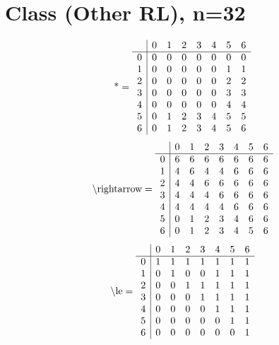 \documentclass[11pt]{article}
\begin{document}
\section{Class (Other RL), n=32}
\[\text{*} = 
\begin{array}{r | r r r r r r r}
 & 0 & 1 & 2 & 3 & 4 & 5 & 6 \\ \hline
0 & 0 & 0 & 0 & 0 & 0 & 0 & 0 \\
1 & 0 & 0 & 0 & 0 & 0 & 1 & 1 \\
2 & 0 & 0 & 0 & 0 & 0 & 2 & 2 \\
3 & 0 & 0 & 0 & 0 & 0 & 3 & 3 \\
4 & 0 & 0 & 0 & 0 & 0 & 4 & 4 \\
5 & 0 & 1 & 2 & 3 & 4 & 5 & 5 \\
6 & 0 & 1 & 2 & 3 & 4 & 5 & 6 \\
\end{array}
\]
\[\text{\textbackslash rightarrow} = 
\begin{array}{r | r r r r r r r}
 & 0 & 1 & 2 & 3 & 4 & 5 & 6 \\ \hline
0 & 6 & 6 & 6 & 6 & 6 & 6 & 6 \\
1 & 4 & 6 & 4 & 4 & 6 & 6 & 6 \\
2 & 4 & 4 & 6 & 6 & 6 & 6 & 6 \\
3 & 4 & 4 & 4 & 6 & 6 & 6 & 6 \\
4 & 4 & 4 & 4 & 4 & 6 & 6 & 6 \\
5 & 0 & 1 & 2 & 3 & 4 & 6 & 6 \\
6 & 0 & 1 & 2 & 3 & 4 & 5 & 6 \\
\end{array}
\]
\[\text{\textbackslash le} = 
\begin{array}{r | r r r r r r r}
 & 0 & 1 & 2 & 3 & 4 & 5 & 6 \\ \hline
0 & 1 & 1 & 1 & 1 & 1 & 1 & 1 \\
1 & 0 & 1 & 0 & 0 & 1 & 1 & 1 \\
2 & 0 & 0 & 1 & 1 & 1 & 1 & 1 \\
3 & 0 & 0 & 0 & 1 & 1 & 1 & 1 \\
4 & 0 & 0 & 0 & 0 & 1 & 1 & 1 \\
5 & 0 & 0 & 0 & 0 & 0 & 1 & 1 \\
6 & 0 & 0 & 0 & 0 & 0 & 0 & 1 \\
\end{array}
\]
\end{document}
